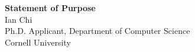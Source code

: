 \documentclass[11pt]{article}
\begin{document}
\begin{center}
    {\Large \textbf{Statement of Purpose}}\\[4pt]
    {\large Ian Chi}\\[2pt]
    Ph.D. Applicant, Department of Computer Science\\
    Cornell University
\end{center}

\vspace{1em}

\end{document}
